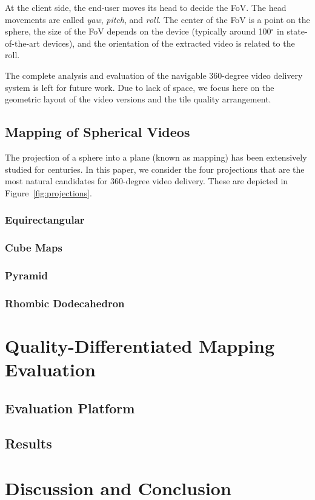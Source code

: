 \documentclass{sig-alternate}
\begin{document}
At the client side, the end-user moves its head to decide the \ac{FoV}. The head movements
are called \emph{yaw}, \emph{pitch}, and \emph{roll}. The center of the \ac{FoV} is a 
point on the sphere, the size of the \ac{FoV} depends on the device (typically
around 100$^\circ$ in state-of-the-art devices), and the orientation of the extracted video 
is related to the roll.

The complete analysis and evaluation of the navigable 360-degree video delivery system
is left for future work. Due to lack of space, we focus here on the geometric layout
of the video versions and the tile quality arrangement.


\subsection{Mapping of Spherical Videos}

The projection of a sphere into a plane (known as mapping) has been extensively studied
for centuries. In this paper, we consider the four projections that are the most natural
candidates for 360-degree video delivery. These are depicted in Figure~\ref{fig:projections}.



\subsubsection{Equirectangular}

\subsubsection{Cube Maps}

\subsubsection{Pyramid}

\subsubsection{Rhombic Dodecahedron}

\section{Quality-Differentiated Mapping Evaluation}

\subsection{Evaluation Platform}

\subsection{Results}

\section{Discussion and Conclusion}

\newpage
%
%
  
%  

\end{document}
